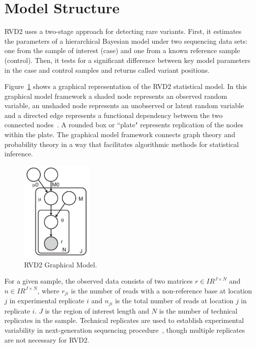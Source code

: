 \documentclass{bioinfo}
\newcommand{\RR}{I\!\!R} %
\begin{document}
\section{Model Structure}\label{sec:model_structure}

RVD2 uses a two-stage approach for detecting rare variants. First, it estimates the parameters of a hierarchical Bayesian model under two sequencing data sets: one from the sample of interest (case) and one from a known reference sample (control). Then, it tests for a significant difference between key model parameters in the case and control samples and returns called variant positions.

Figure~\ref{fig:graphical_model} shows a graphical representation of the RVD2 statistical model. In this graphical model framework a shaded node represents an observed random variable, an unshaded node represents an unobserved or latent random variable and a directed edge represents a functional dependency between the two connected nodes~\citep{jordan2004graphical}. A rounded box or ``plate" represents replication of the nodes within the plate. The graphical model framework connects graph theory and probability theory in a way that facilitates algorithmic methods for statistical inference.

\begin{figure}[!bpth]
\centering
\vspace{-10pt}
\includegraphics[width=35mm]{pdf_figs/RVD2_model.pdf}
\caption{RVD2 Graphical Model.}
\vspace{-20pt}
\label{fig:graphical_model}
\end{figure}

For a given sample, the observed data consists of two matrices $r \in \RR^{J \times N}$ and $n \in \RR^{J \times N}$, where $r_{ji}$ is the number of reads with a non-reference base at location $j$ in experimental replicate $i$ and $n_{ji}$ is the total number of reads at location $j$ in replicate $i$. $ J $ is the region of interest length and $ N $ is the number of technical replicates in the sample.\label{replicate definition} Technical replicates are used to establish experimental variability in next-generation sequencing procedure~\citep{robasky2013role}, though multiple replicates are not necessary for RVD2.
\end{document}

